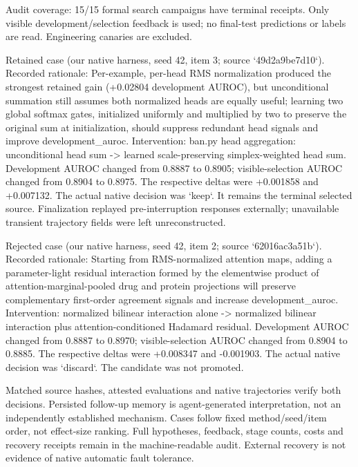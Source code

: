 Audit coverage: 15/15 formal search campaigns have terminal receipts. Only visible development/selection feedback is used; no final-test predictions or labels are read. Engineering canaries are excluded.

Retained case (our native harness, seed 42, item 3; source `49d2a9be7d10`). Recorded rationale: Per-example, per-head RMS normalization produced the strongest retained gain (+0.02804 development AUROC), but unconditional summation still assumes both normalized heads are equally useful; learning two global softmax gates, initialized uniformly and multiplied by two to preserve the original sum at initialization, should suppress redundant head signals and improve development\_auroc. Intervention: ban.py head aggregation: unconditional head sum -> learned scale-preserving simplex-weighted head sum. Development AUROC changed from 0.8887 to 0.8905; visible-selection AUROC changed from 0.8904 to 0.8975. The respective deltas were +0.001858 and +0.007132. The actual native decision was `keep`. It remains the terminal selected source. Finalization replayed pre-interruption responses externally; unavailable transient trajectory fields were left unreconstructed.

Rejected case (our native harness, seed 42, item 2; source `62016ac3a51b`). Recorded rationale: Starting from RMS-normalized attention maps, adding a parameter-light residual interaction formed by the elementwise product of attention-marginal-pooled drug and protein projections will preserve complementary first-order agreement signals and increase development\_auroc. Intervention: normalized bilinear interaction alone -> normalized bilinear interaction plus attention-conditioned Hadamard residual. Development AUROC changed from 0.8887 to 0.8970; visible-selection AUROC changed from 0.8904 to 0.8885. The respective deltas were +0.008347 and -0.001903. The actual native decision was `discard`. The candidate was not promoted.

Matched source hashes, attested evaluations and native trajectories verify both decisions. Persisted follow-up memory is agent-generated interpretation, not an independently established mechanism. Cases follow fixed method/seed/item order, not effect-size ranking. Full hypotheses, feedback, stage counts, costs and recovery receipts remain in the machine-readable audit. External recovery is not evidence of native automatic fault tolerance.
